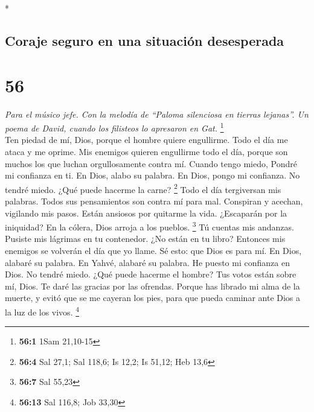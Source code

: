 \begin{paracol}{2}
\begin{otherlanguage}{english}
\end{otherlanguage}

\switchcolumn[0]*

\hypertarget{coraje-seguro-en-una-situaciuxf3n-desesperada}{%
\subsection{Coraje seguro en una situación
desesperada}\label{coraje-seguro-en-una-situaciuxf3n-desesperada}}

\hypertarget{section-110}{%
\section{56}\label{section-110}}

\emph{Para el músico jefe. Con la melodía de ``Paloma silenciosa en
tierras lejanas''. Un poema de David, cuando los filisteos lo apresaron
en Gat.} \footnote{\textbf{56:1} 1Sam 21,10-15}\\
 Ten piedad de mí, Dios, porque el hombre quiere
engullirme. Todo el día me ataca y me oprime.  Mis
enemigos quieren engullirme todo el día, porque son muchos los que
luchan orgullosamente contra mí.  Cuando tengo miedo,
Pondré mi confianza en ti.  En Dios, alabo su palabra. En
Dios, pongo mi confianza. No tendré miedo. ¿Qué puede hacerme la carne?
\footnote{\textbf{56:4} Sal 27,1; Sal 118,6; Is 12,2; Is 51,12; Heb 13,6}
 Todo el día tergiversan mis palabras. Todos sus
pensamientos son contra mí para mal.  Conspiran y acechan,
vigilando mis pasos. Están ansiosos por quitarme la vida. 
¿Escaparán por la iniquidad? En la cólera, Dios arroja a los pueblos.
\footnote{\textbf{56:7} Sal 55,23}  Tú cuentas mis
andanzas. Pusiste mis lágrimas en tu contenedor. ¿No están en tu libro?
 Entonces mis enemigos se volverán el día que yo llame. Sé
esto: que Dios es para mí.  En Dios, alabaré su palabra.
En Yahvé, alabaré su palabra.  He puesto mi confianza en
Dios. No tendré miedo. ¿Qué puede hacerme el hombre?  Tus
votos están sobre mí, Dios. Te daré las gracias por las ofrendas.
 Porque has librado mi alma de la muerte, y evitó que se
me cayeran los pies, para que pueda caminar ante Dios a la luz de los
vivos. \footnote{\textbf{56:13} Sal 116,8; Job 33,30}

\switchcolumn
\begin{otherlanguage}{english}


\end{otherlanguage}
\end{paracol}
